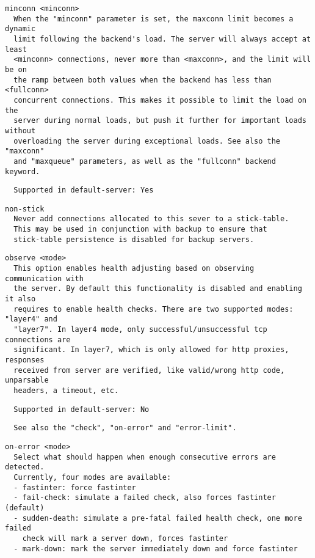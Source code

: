 \begin{verbatim}
minconn <minconn>
  When the "minconn" parameter is set, the maxconn limit becomes a dynamic
  limit following the backend's load. The server will always accept at least
  <minconn> connections, never more than <maxconn>, and the limit will be on
  the ramp between both values when the backend has less than <fullconn>
  concurrent connections. This makes it possible to limit the load on the
  server during normal loads, but push it further for important loads without
  overloading the server during exceptional loads. See also the "maxconn"
  and "maxqueue" parameters, as well as the "fullconn" backend keyword.
\end{verbatim}

\begin{verbatim}
  Supported in default-server: Yes
\end{verbatim}

\begin{verbatim}
non-stick
  Never add connections allocated to this sever to a stick-table.
  This may be used in conjunction with backup to ensure that
  stick-table persistence is disabled for backup servers.
\end{verbatim}

\begin{verbatim}
observe <mode>
  This option enables health adjusting based on observing communication with
  the server. By default this functionality is disabled and enabling it also
  requires to enable health checks. There are two supported modes: "layer4" and
  "layer7". In layer4 mode, only successful/unsuccessful tcp connections are
  significant. In layer7, which is only allowed for http proxies, responses
  received from server are verified, like valid/wrong http code, unparsable
  headers, a timeout, etc.
\end{verbatim}

\begin{verbatim}
  Supported in default-server: No
\end{verbatim}

\begin{verbatim}
  See also the "check", "on-error" and "error-limit".
\end{verbatim}

\begin{verbatim}
on-error <mode>
  Select what should happen when enough consecutive errors are detected.
  Currently, four modes are available:
  - fastinter: force fastinter
  - fail-check: simulate a failed check, also forces fastinter (default)
  - sudden-death: simulate a pre-fatal failed health check, one more failed
    check will mark a server down, forces fastinter
  - mark-down: mark the server immediately down and force fastinter
\end{verbatim}

